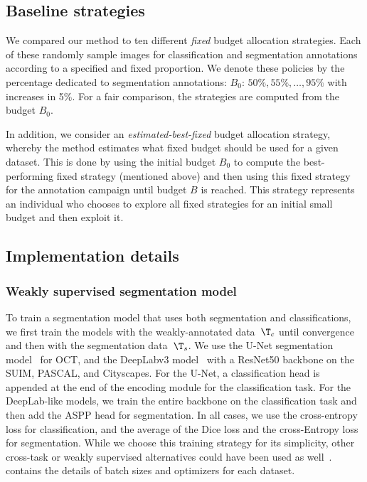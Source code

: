 \subsection{Baseline strategies} We compared our method to ten different \textit{fixed} budget allocation strategies. Each of these randomly sample images for classification and segmentation annotations according to a specified and fixed proportion. We denote these policies by the percentage dedicated to segmentation annotations: $B_0$: $50\%, 55\%, \ldots, 95\%$ with increases in 5\%. For a fair comparison, the strategies are computed from the budget $B_0$.

In addition, we consider an \textit{estimated-best-fixed} budget allocation strategy, whereby the method estimates what fixed budget should be used for a given dataset. This is done by using the initial budget $B_0$ to compute the best-performing fixed strategy (mentioned above) and then using this fixed strategy for the annotation campaign until budget $B$ is reached. This strategy represents an individual who chooses to explore all fixed strategies for an initial small budget and then exploit it. 

\subsection{Implementation details} 
\subsubsection{Weakly supervised segmentation model} To train a segmentation model that uses both segmentation and classifications, we first train the models with the weakly-annotated data~$\T_c$ until convergence and then with the segmentation data~$\T_s$. We use the U-Net segmentation model~ for  OCT, and the DeepLabv3 model~ with a ResNet50 backbone on the SUIM, PASCAL, and Cityscapes. For the U-Net, a classification head is appended at the end of the encoding module for the classification task. For the DeepLab-like models, we train the entire backbone on the classification task and then add the ASPP head for segmentation. In all cases, we use the cross-entropy loss for classification, and the average of the Dice loss and the cross-Entropy loss for segmentation. While we choose this training strategy for its simplicity, other cross-task or weakly supervised alternatives could have been used as well~.  contains the details of batch sizes and optimizers for each dataset.

